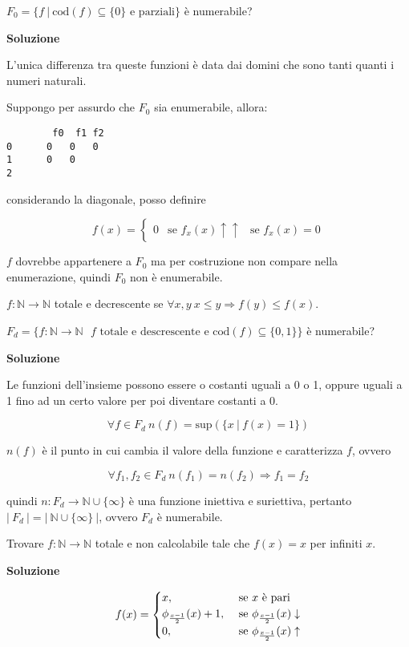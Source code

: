 $ F_0 = \{f \: | \: \text{cod}(f) \subseteq \{0\} \text{ e parziali}\}$ è numerabile?

\textbf{Soluzione}

L'unica differenza tra queste funzioni è data dai domini che sono tanti quanti i numeri naturali.

Suppongo per assurdo che $ F_0 $ sia enumerabile, allora:

\begin{verbatim}
		f0	f1 f2
0      0   0   0
1      0   0
2
\end{verbatim}

considerando la diagonale, posso definire

$$
f(x) = \begin{cases}
0 &\text{se } f_x(x)\uparrow
\uparrow &\text{se } f_x(x)=0
\end{cases}
$$

$ f $ dovrebbe appartenere a $ F_0 $ ma per costruzione non compare nella enumerazione, quindi $ F_0 $ non è enumerabile.


$ f : \mathbb{N} \rightarrow \mathbb{N} $ totale e decrescente se $ \forall x,y \: x \leq y \Rightarrow f(y) \leq f(x) $.

$ F_d = \{ f : \mathbb{N} \rightarrow \mathbb{N} \: \ \: f \text{ totale e descrescente e } \text{cod}(f) \subseteq \{0,1\} \} $ è numerabile?

\textbf{Soluzione}

Le funzioni dell'insieme possono essere o costanti uguali a 0 o 1, oppure uguali a 1 fino ad un certo valore per poi diventare costanti a 0.

$$ \forall f \in F_d \: n(f)  = \text{sup}(\{x \: | \: f(x) = 1\})$$

$ n(f) $ è il punto in cui cambia il valore della funzione e caratterizza $ f $, ovvero

$$
\forall f_1, f_2 \in F_d \: n(f_1) = n(f_2) \Rightarrow f_1 = f_2
$$

quindi $ n : F_d \rightarrow \mathbb{N} \cup \{\infty\} $ è una funzione iniettiva e suriettiva, pertanto $ |\: F_d \:| = |\: \mathbb{N} \cup \{ \infty \} \:| $, ovvero $ F_d $ è numerabile.



Trovare $ f : \mathbb{N} \rightarrow \mathbb{N} $ totale e non calcolabile tale che $ f(x)  =x $ per infiniti $ x $.

\textbf{Soluzione}

$$
f(x) = \begin{cases}
x, &\text{ se $ x $ è pari} \\
\phi_{\frac{x-1}{2}}(x) +1, &\text{ se } \phi_{\frac{x-1}{2}}(x) \downarrow \\
0, &\text{ se } \phi_{\frac{x-1}{2}}(x) \uparrow 
\end{cases}
$$

